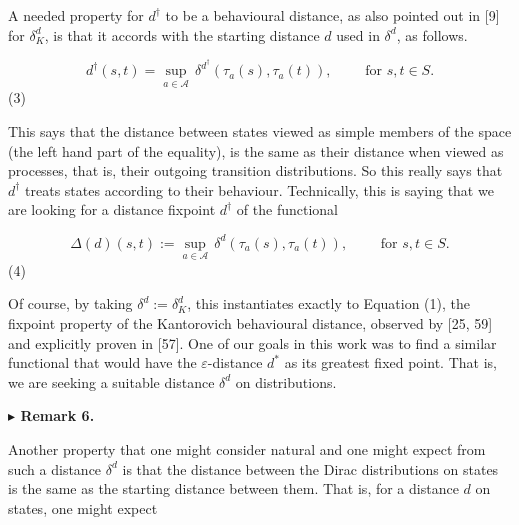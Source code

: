  
 
A needed property for $d^{\dagger}$ to be a behavioural distance, as also pointed out in [9] for $\delta_{K}^{d}$, is that it accords with the starting distance $d$ used in $\delta^{d}$, as follows.\par
  
\par  \quad  \[d^{\dagger}(s,t)=\sup_{a\in\mathcal{A}}\,\delta^{d^{\dagger}}(\tau_{a}(s),\tau_{a}(t)),\qquad\mbox{ for $s,t\in S$.}\]\quad  \quad  (3)\quad  
  
This says that the distance between states viewed as simple members of the space (the left hand part of the equality), is the same as their distance when viewed as processes, that is, their outgoing transition distributions. So this really says that $d^{\dagger}$ treats states according to their behaviour. Technically, this is saying that we are looking for a distance fixpoint $d^{\dagger}$ of the functional\par
  
\par  \quad  \[\Delta(d)(s,t):=\sup_{a\in\mathcal{A}}\,\delta^{d}(\tau_{a}(s),\tau_{a}(t)),\qquad\mbox{ for $s,t\in S$.}\]\quad  \quad  (4)\quad  
  
Of course, by taking $\delta^{d}:=\delta_{K}^{d}$, this instantiates exactly to Equation (1), the fixpoint property of the Kantorovich behavioural distance, observed by [25, 59] and explicitly proven in [57]. One of our goals in this work was to find a similar functional that would have the $\varepsilon$-distance $d^{*}$ as its greatest fixed point. That is, we are seeking a suitable distance $\delta^{d}$ on distributions.\par
 
 
 
\par\medskip\noindent\textbf{$\blacktriangleright$ Remark 6.}\par
 
 
Another property that one might consider natural and one might expect from such a distance $\delta^{d}$ is that the distance between the Dirac distributions on states is the same as the starting distance between them. That is, for a distance $d$ on states, one might expect\par
  
